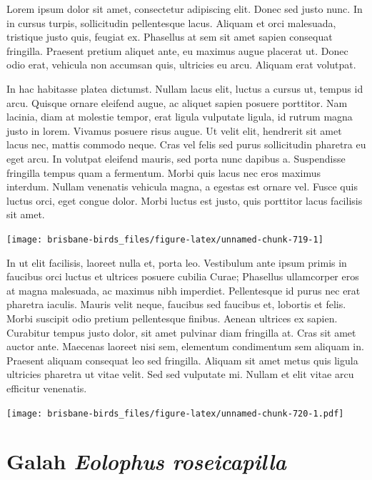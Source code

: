 \documentclass[]{book}
\let\origfigure\figure
\let\endorigfigure\endfigure
\renewenvironment{figure}[1][2] {
  \expandafter\origfigure\expandafter[H]
} {
  \endorigfigure
}
\begin{document}
Lorem ipsum dolor sit amet, consectetur adipiscing elit. Donec sed justo
nunc. In in cursus turpis, sollicitudin pellentesque lacus. Aliquam et
orci malesuada, tristique justo quis, feugiat ex. Phasellus at sem sit
amet sapien consequat fringilla. Praesent pretium aliquet ante, eu
maximus augue placerat ut. Donec odio erat, vehicula non accumsan quis,
ultricies eu arcu. Aliquam erat volutpat.

In hac habitasse platea dictumst. Nullam lacus elit, luctus a cursus ut,
tempus id arcu. Quisque ornare eleifend augue, ac aliquet sapien posuere
porttitor. Nam lacinia, diam at molestie tempor, erat ligula vulputate
ligula, id rutrum magna justo in lorem. Vivamus posuere risus augue. Ut
velit elit, hendrerit sit amet lacus nec, mattis commodo neque. Cras vel
felis sed purus sollicitudin pharetra eu eget arcu. In volutpat eleifend
mauris, sed porta nunc dapibus a. Suspendisse fringilla tempus quam a
fermentum. Morbi quis lacus nec eros maximus interdum. Nullam venenatis
vehicula magna, a egestas est ornare vel. Fusce quis luctus orci, eget
congue dolor. Morbi luctus est justo, quis porttitor lacus facilisis sit
amet.

\begin{figure}
\texttt{[image: brisbane-birds\_files/figure-latex/unnamed-chunk-719-1]} \caption{insert figure caption}\label{fig:unnamed-chunk-719}
\end{figure}

In ut elit facilisis, laoreet nulla et, porta leo. Vestibulum ante ipsum
primis in faucibus orci luctus et ultrices posuere cubilia Curae;
Phasellus ullamcorper eros at magna malesuada, ac maximus nibh
imperdiet. Pellentesque id purus nec erat pharetra iaculis. Mauris velit
neque, faucibus sed faucibus et, lobortis et felis. Morbi suscipit odio
pretium pellentesque finibus. Aenean ultrices ex sapien. Curabitur
tempus justo dolor, sit amet pulvinar diam fringilla at. Cras sit amet
auctor ante. Maecenas laoreet nisi sem, elementum condimentum sem
aliquam in. Praesent aliquam consequat leo sed fringilla. Aliquam sit
amet metus quis ligula ultricies pharetra ut vitae velit. Sed sed
vulputate mi. Nullam et elit vitae arcu efficitur venenatis.

\begin{figure}
\centering
\texttt{[image: brisbane-birds\_files/figure-latex/unnamed-chunk-720-1.pdf]}
\caption{\label{fig:unnamed-chunk-720}insert figure caption}
\end{figure}

\section{\texorpdfstring{Galah \emph{Eolophus
roseicapilla}}{Galah Eolophus roseicapilla}}\label{galah-eolophus-roseicapilla}
\end{document}
